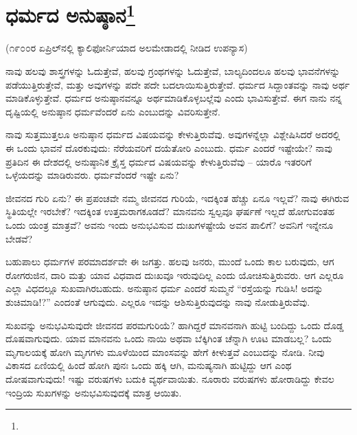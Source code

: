 
\chapter[ಧರ್ಮದ ಅನುಷ್ಠಾನ]{ಧರ್ಮದ ಅನುಷ್ಠಾನ\protect\footnote{}}

\begin{center}
(೧೯೦೦ರ ಏಪ್ರಿಲ್‌ನಲ್ಲಿ ಕ್ಯಾಲಿಫೋರ್ನಿಯಾದ ಅಲಮೇಡಾದಲ್ಲಿ ನೀಡಿದ ಉಪನ್ಯಾಸ)
\end{center}

ನಾವು ಹಲವು ಶಾಸ್ತ್ರಗಳನ್ನು ಓದುತ್ತೇವೆ, ಹಲವು ಗ್ರಂಥಗಳನ್ನು ಓದುತ್ತೇವೆ, ಬಾಲ್ಯದಿಂದಲೂ ಹಲವು ಭಾವನೆಗಳನ್ನು ಪಡೆಯುತ್ತಿರುತ್ತೇವೆ, ಮತ್ತು ಅವುಗಳನ್ನು ಪದೇ ಪದೇ ಬದಲಾಯಿಸುತ್ತಿರುತ್ತೇವೆ. ಧರ್ಮದ ಸಿದ್ದಾಂತವನ್ನು ನಾವು ಅರ್ಥ ಮಾಡಿಕೊಳ್ಳುತ್ತೇವೆ. ಧರ್ಮದ ಅನುಷ್ಠಾನವನ್ನೂ ಅರ್ಥಮಾಡಿಕೊಳ್ಳಬಲ್ಲೆವು ಎಂದು ಭಾವಿಸುತ್ತೇವೆ. ಈಗ ನಾನು ನನ್ನ ದೃಷ್ಟಿಯಲ್ಲಿ ಅನುಷ್ಠಾನ ಧರ್ಮವೆಂದರೆ ಏನು ಎಂಬುದನ್ನು ವಿವರಿಸುತ್ತೇನೆ.

ನಾವು ಸುತ್ತಮುತ್ತಲೂ ಅನುಷ್ಠಾನ ಧರ್ಮದ ವಿಷಯವನ್ನು ಕೇಳುತ್ತಿರುವೆವು. ಅವುಗಳನ್ನೆಲ್ಲಾ ವಿಶ್ಲೇಷಿಸಿದರೆ ಅದರಲ್ಲಿ ಈ ಒಂದು ಭಾವನೆ ದೊರಕುವುದು: ನೆರೆಯವರಿಗೆ ದಯೆತೋರಿ ಎಂಬುದು. ಧರ್ಮ ಎಂದರೆ ಇಷ್ಟೇಯೇ? ನಾವು ಪ್ರತಿದಿನ ಈ ದೇಶದಲ್ಲಿ ಅನುಷ್ಠಾನಿಕ ಕ್ರೈಸ್ತ ಧರ್ಮದ ವಿಷಯವನ್ನು ಕೇಳುತ್ತಿರುವೆವು – ಯಾರೊ ಇತರರಿಗೆ ಒಳ್ಳೆಯದನ್ನು ಮಾಡಿರುವರು. ಧರ್ಮವೆಂದರೆ ಇಷ್ಟೇ ಏನು?

ಜೀವನದ ಗುರಿ ಏನು? ಈ ಪ್ರಪಂಚವೇ ನಮ್ಮ ಜೀವನದ ಗುರಿಯೆ, ಇದಕ್ಕಿಂತ ಹೆಚ್ಚು ಏನೂ ಇಲ್ಲವೆ? ನಾವು ಈಗಿರುವ ಸ್ಥಿತಿಯಲ್ಲೇ ಇರಬೇಕೆ? ಇದಕ್ಕಿಂತ ಉತ್ತಮರಾಗಕೂಡದೆ? ಮಾನವನು ಸ್ವಲ್ಪವೂ ಘರ್ಷಣೆ ಇಲ್ಲದೆ ಹೋಗುವಂತಹ ಒಂದು ಯಂತ್ರ ಮಾತ್ರವೆ? ಅವನು ಇಂದು ಅನುಭವಿಸುವ ದುಃಖಗಳಷ್ಟೇಯೆ ಅವನ ಪಾಲಿಗೆ? ಅವನಿಗೆ ಇನ್ನೇನೂ ಬೇಡವೆ?

ಬಹುಪಾಲು ಧರ್ಮಗಳ ಪರಮಾದರ್ಶವೇ ಈ ಜಗತ್ತು. ಹಲವು ಜನರು, ಮುಂದೆ ಒಂದು ಕಾಲ ಬರುವುದು, ಆಗ ರೋಗರುಜಿನ, ದಾರಿ ಮತ್ತು ಯಾವ ವಿಧವಾದ ದುಃಖವೂ ಇರುವುದಿಲ್ಲ ಎಂದು ಯೋಚಿಸುತ್ತಿರುವರು. ಆಗ ಎಲ್ಲರೂ ಎಲ್ಲಾ ವಿಧದಲ್ಲೂ ಸುಖವಾಗಿರಬಹುದು. ಅನುಷ್ಠಾನ ಧರ್ಮ ಎಂದರೆ ಸುಮ್ಮನೆ “ರಸ್ತೆಯನ್ನು ಗುಡಿಸಿ! ಅದನ್ನು ಶುಚಿಮಾಡಿ!?” ಎಂದಂತೆ ಆಗುವುದು. ಎಲ್ಲರೂ ಇದನ್ನು ಆಶಿಸುತ್ತಿರುವುದನ್ನು ನಾವು ನೋಡುತ್ತಿರುವೆವು.

ಸುಖವನ್ನು ಅನುಭವಿಸುವುದೇ ಜೀವನದ ಪರಮಗುರಿಯೆ? ಹಾಗಿದ್ದರೆ ಮಾನವನಾಗಿ ಹುಟ್ಟಿ ಬಂದಿದ್ದು ಒಂದು ದೊಡ್ಡ ದೊಷವಾಗುವುದು. ಯಾವ ಮಾನವನು ಒಂದು ನಾಯಿ ಅಥವಾ ಬೆಕ್ಕಿಗಿಂತ ಚೆನ್ನಾಗಿ ಊಟ ಮಾಡಬಲ್ಲ? ಒಂದು ಮೃಗಾಲಯಕ್ಕೆ ಹೋಗಿ ಮೃಗಗಳು ಮೂಳೆಯಿಂದ ಮಾಂಸವನ್ನು ಹೇಗೆ ಕೀಳುತ್ತವೆ ಎಂಬುದನ್ನು ನೋಡಿ. ನೀವು ವಿಕಾಸದ ಏಣಿಯಲ್ಲಿ ಹಿಂದೆ ಹೋಗಿ ಪುನಃ ಒಂದು ಹಕ್ಕಿ ಆಗಿ, ಮನುಷ್ಯನಾಗಿ ಹುಟ್ಟಿದ್ದು ಆಗ ಎಂಥ ದೋಷವಾಗುವುದು! ಇಷ್ಟು ವರುಷಗಳು ಬದುಕಿ ವ್ಯರ್ಥವಾಯಿತು. ನೂರಾರು ವರುಷಗಳು ಹೋರಾಡಿದ್ದು ಕೇವಲ ಇಂದ್ರಿಯ ಸುಖಗಳನ್ನು ಅನುಭವಿಸುವುದಕ್ಕೆ ಮಾತ್ರ ಆಯಿತು.

